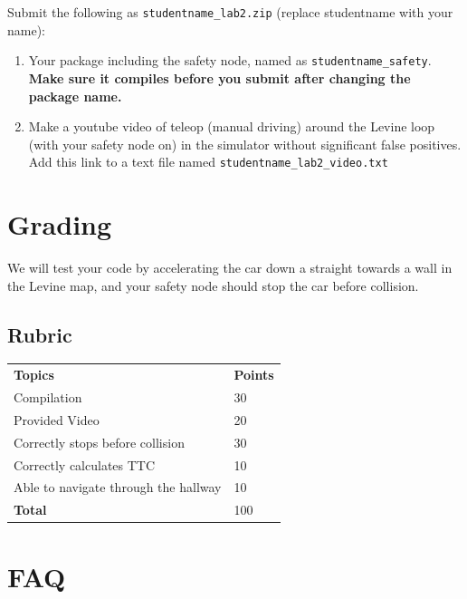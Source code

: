 \documentclass[letta4 paper]{article}
\numberwithin{equation}{section}
\newcommand{\0}{\mathbf{0}}
\begin{document}
	Submit the following as \texttt{studentname\_lab2.zip} (replace studentname with your name):
	

	\begin{enumerate}
		\item Your package including the safety node, named as \texttt{studentname\_safety}. \textbf{Make sure it compiles before you submit after changing the package name.}
		\item Make a youtube video of teleop (manual driving) around the Levine loop (with your safety node on) in the simulator without significant false positives. Add this link to a text file named \texttt{studentname\_lab2\_video.txt}
	\end{enumerate}

	\section{Grading}
	
	We will test your code by accelerating the car down a straight towards a wall in the Levine map, and your safety node should stop the car before collision.
	
	\subsection{Rubric}
	\begin{table}[h]
		\begin{tabular}{ll}
			\textbf{Topics} & \textbf{Points} \\
			Compilation & 30 \\
			Provided Video & 20 \\
			Correctly stops before collision & 30 \\
			Correctly calculates TTC & 10 \\
			Able to navigate through the hallway & 10 \\
			\textbf{Total} & 100 \\
		\end{tabular}
	\end{table}
	
	\newpage
	\section{FAQ}
		
\end{document}
